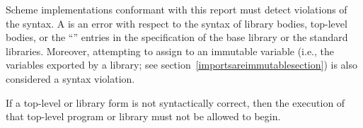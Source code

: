 Scheme implementations conformant with this report must detect
violations of the syntax.  A  is an error
with respect to the syntax of library bodies, top-level bodies,
or the ``\exprtype'' entries in the
specification of the base library or the standard libraries.
Moreover, attempting to assign to an immutable variable (i.e., the
variables exported by a library; see
section~\ref{importsareimmutablesection}) is also
considered a syntax violation.

If a top-level or library form is not syntactically correct, then the
execution of that top-level program or library must not be allowed to begin.

